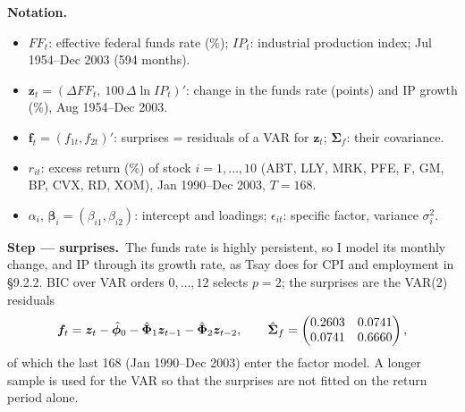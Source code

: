 \documentclass[11pt,a4paper]{article}
\newenvironment{notacao}{\par\smallskip\noindent\textbf{Notation.}\begin{itemize}[leftmargin=1.4em,topsep=1pt,itemsep=0pt]\small}{\end{itemize}}
\newcommand{\passo}[2]{\par\smallskip\noindent\textbf{Step --- #1.}~#2}
\begin{document}
\begin{sol}
\begin{notacao}
\item $FF_t$: effective federal funds rate (\%); $IP_t$: industrial production index; Jul 1954--Dec 2003 (594 months).
\item $\bm z_t=(\Delta FF_t,\ 100\,\Delta\ln IP_t)'$: change in the funds rate (points) and IP growth (\%), Aug 1954--Dec 2003.
\item $\bm f_t=(f_{1t},f_{2t})'$: surprises = residuals of a VAR for $\bm z_t$; $\bm\Sigma_f$: their covariance.
\item $r_{it}$: excess return (\%) of stock $i=1,\dots,10$ (ABT, LLY, MRK, PFE, F, GM, BP, CVX, RD, XOM), Jan 1990--Dec 2003, $T=168$.
\item $\alpha_i$, $\bm\beta_i=(\beta_{i1},\beta_{i2})$: intercept and loadings; $\epsilon_{it}$: specific factor, variance $\sigma_i^2$.
\end{notacao}

\passo{surprises}{The funds rate is highly persistent, so I model its monthly change, and IP through its
growth rate, as Tsay does for CPI and employment in \S9.2.2. BIC over VAR orders $0,\dots,12$ selects
$p=2$; the surprises are the VAR(2) residuals
\begin{equation}
\bm f_t=\bm z_t-\hat{\bm{\phi}}_0-\hat{\bm{\Phi}}_1\bm z_{t-1}-\hat{\bm{\Phi}}_2\bm z_{t-2},\qquad
\hat{\bm\Sigma}_f=\begin{pmatrix}0.2603&0.0741\\0.0741&0.6660\end{pmatrix},\label{eq:q5f}
\end{equation}
of which the last 168 (Jan 1990--Dec 2003) enter the factor model. A longer sample is used for the VAR so that
the surprises are not fitted on the return period alone.}


\end{sol}
\end{document}
